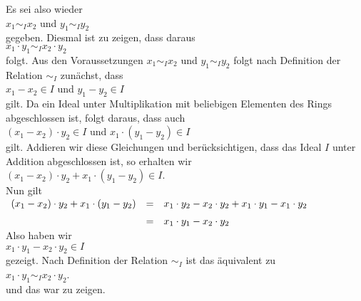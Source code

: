 \begin{enumerate}
      Es sei also wieder
      \\[0.2cm]
      \hspace*{1.3cm}
      $x_1 \sim_I x_2$ \quad und \quad $y_1 \sim_I y_2$ 
      \\[0.2cm]
      gegeben.  Diesmal ist zu zeigen, dass daraus
      \\[0.2cm]
      \hspace*{1.3cm}
      $x_1 \cdot y_1 \sim_I x_2 \cdot y_2$
      \\[0.2cm]
      folgt.  Aus den Voraussetzungen $x_1 \sim_I x_2$  und $y_1 \sim_I y_2$ folgt nach Definition
      der Relation $\sim_I$ zunächst, dass
      \\[0.2cm]
      \hspace*{1.3cm}
      $x_1 - x_2 \in I$ \quad und \quad $y_1 - y_2 \in I$ 
      \\[0.2cm]
      gilt.  Da ein Ideal unter Multiplikation mit beliebigen Elementen des Rings abgeschlossen ist,
      folgt daraus, dass auch
      \\[0.2cm]
      \hspace*{1.3cm}
      $(x_1 - x_2) \cdot y_2 \in I$ \quad und \quad $x_1 \cdot (y_1 - y_2) \in I$ 
      \\[0.2cm]
      gilt. Addieren wir diese Gleichungen und berücksichtigen, dass das Ideal $I$ unter Addition
      abgeschlossen ist, so erhalten wir
      \\[0.2cm]
      \hspace*{1.3cm}
      $(x_1 - x_2) \cdot y_2 + x_1 \cdot (y_1 - y_2) \in I$.
      \\[0.2cm]
      Nun gilt
      \\[0.2cm]
      \hspace*{1.3cm}
      $
      \begin{array}[t]{lcl}
            (x_1 - x_2) \cdot y_2 + x_1 \cdot (y_1 - y_2) 
      & = & x_1 \cdot y_2 - x_2 \cdot y_2 + x_1 \cdot y_1 - x_1 \cdot y_2 \\[0.2cm]
      & = & x_1 \cdot y_1 - x_2 \cdot y_2
      \end{array}
      $
      \\[0.2cm]
      Also haben wir
      \\[0.2cm]
      \hspace*{1.3cm}
      $x_1 \cdot y_1 - x_2 \cdot y_2 \in I$
      \\[0.2cm] 
      gezeigt. Nach Definition der Relation $\sim_I$ ist das äquivalent zu
      \\[0.2cm]
      \hspace*{1.3cm}
      $x_1 \cdot y_1 \sim_I x_2 \cdot y_2$. 
      \\[0.2cm]
      und das war zu zeigen. \checkmark 
\end{enumerate}

